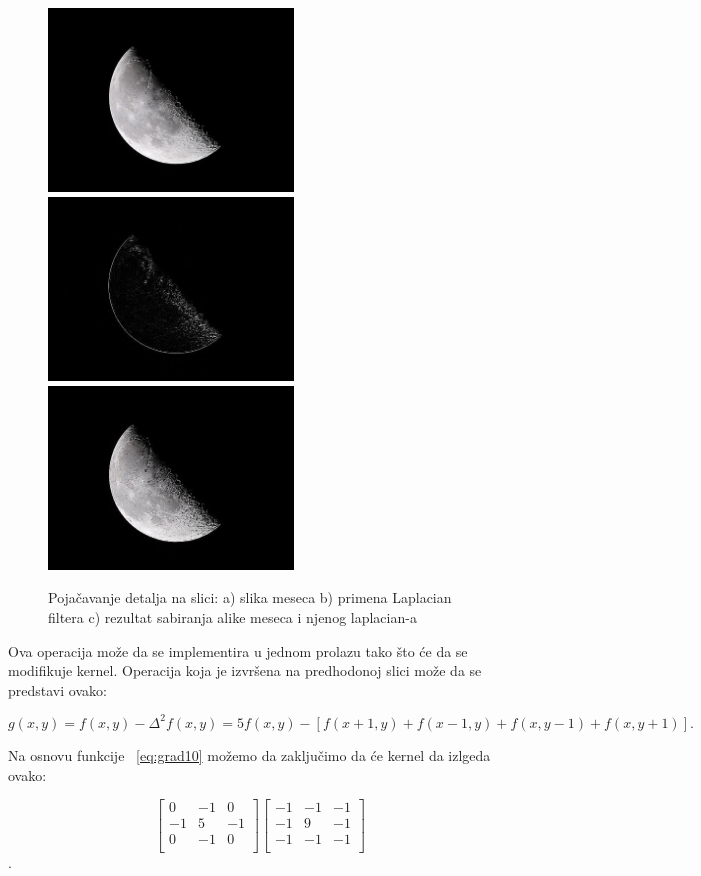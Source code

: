 \documentclass[a4paper,12pt,titlepage]{article}
\begin{document}
\begin{figure}[ht!]
\centering
\includegraphics[width=65mm]{img/moon.jpg}
\includegraphics[width=65mm]{img/moonLap.jpg}
\includegraphics[width=65mm]{img/moonEn.jpg}
\caption{Pojačavanje detalja na slici: a) slika meseca b) primena Laplacian filtera c) rezultat sabiranja alike meseca i njenog laplacian-a}
\label{mesec}
\end{figure}

Ova operacija može da se implementira u jednom prolazu tako što će da se modifikuje kernel. Operacija koja je izvršena na predhodonoj slici može da se predstavi ovako:

\begin{equation}\label{eq:grad10}
g(x, y) = f(x, y) - \Delta^{2}f(x, y) = 5f(x, y) - [f(x + 1, y) + f(x - 1, y) + f(x, y - 1) + f(x, y + 1)].
\end{equation} 

\newpage
Na osnovu funkcije ~\ref{eq:grad10} možemo da zaključimo da će kernel da izlgeda ovako:

\[
\begin{bmatrix}
     0 & -1 & 0 \\
     -1 & 5 & -1 \\
     0 & -1 & 0 \\
\end{bmatrix}
\begin{bmatrix}
     -1 & -1 & -1 \\
     -1 & 9 & -1 \\
     -1 & -1 & -1 \\
\end{bmatrix}
\]. 
\end{document}
